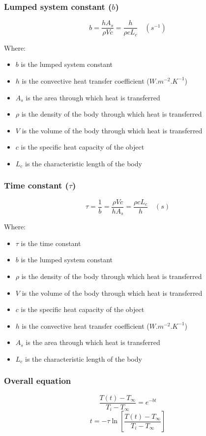 \documentclass[11pt]{article}
\begin{document}
 \newpage

\subsubsection{Lumped system constant (\(b\))}
\label{sec:orge5a4cb1}
\[b = \frac{h A_s}{\rho V c} = \frac{h}{\rho c L_c} \quad (\unit{s^{-1}})\]

Where:
\begin{itemize}
\item \(b\) is the lumped system constant
\item \(h\) is the convective heat transfer coefficient (\(\unit{W.m^{-2}.K^{-1}}\))
\item \(A_s\) is the area through which heat is transferred
\item \(\rho\) is the density of the body through which heat is transferred
\item \(V\) is the volume of the body through which heat is transferred
\item \(c\) is the specific heat capacity of the object
\item \(L_c\) is the characteristic length of the body
\end{itemize}

\subsubsection{Time constant (\(\tau\))}
\label{sec:org00d2054}
\[\tau = \frac{1}{b} = \frac{\rho V c}{h A_s} = \frac{\rho c L_c}{h} \quad (\unit{s})\]

Where:
\begin{itemize}
\item \(\tau\) is the time constant
\item \(b\) is the lumped system constant
\item \(\rho\) is the density of the body through which heat is transferred
\item \(V\) is the volume of the body through which heat is transferred
\item \(c\) is the specific heat capacity of the object
\item \(h\) is the convective heat transfer coefficient (\(\unit{W.m^{-2}.K^{-1}}\))
\item \(A_s\) is the area through which heat is transferred
\item \(L_c\) is the characteristic length of the body
\end{itemize}

\subsubsection{Overall equation}
\label{sec:org359ad78}
\[\frac{T(t) - T_{\infty}}{T_i - T_{\infty}} = e^{-bt}\]
\[t = - \tau \ln \left[\frac{T(t) - T_{\infty}}{T_i - T_{\infty}} \right]\]
\end{document}
